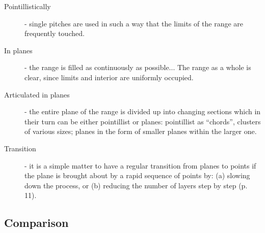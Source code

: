 \documentclass[a4paper,11pt]{article}
\newenvironment{MyShadequote}[1][]
    {\begin{mdframed}[style=MyShadeQuoteStyle,#1]}
    {\end{mdframed}}
\begin{document}
\begin{MyShadequote}
  \begin{description}
    \item[Pointillistically] - single pitches are used in such a way that the limits of the range are frequently touched.

    \item[In planes] - the range is filled as continuously as possible...
    The range as a whole is clear, since limits and interior are uniformly occupied.

    \item[Articulated in planes] - the entire plane of the range is divided up into changing sections which in their turn can be either pointillist or planes:
    pointillist as ``chords'', clusters of various sizes;
    planes in the form of smaller planes within the larger one.

    \item[Transition] - it is a simple matter to have a regular transition from planes to points if the plane is brought about by a rapid sequence of points by:
    (a) slowing down the process,
    or (b) reducing the number of layers step by step (p. 11).
  \end{description}

\end{MyShadequote}

\subsection{Comparison}
\label{sub:comparison}
\end{document}

